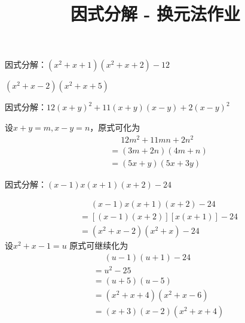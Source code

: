 \documentclass[windows,csize4]{BHCexam}
\title{因式分解 - 换元法作业}
\begin{document}
\maketitle


\begin{groups}
    \begin{questions}[]

        \question[5] 因式分解：$(x^2+x+1)(x^2+x+2)-12$
        \begin{solution}{0.5cm}
            \methodonly $(x^2+x-2)(x^2+x+5)$
        \end{solution}
        \vspace{3.5cm}

        \question[5] 因式分解：$12(x+y)^2+11(x+y)(x-y)+2(x-y)^2$
        \begin{solution}{0.5cm}
            \methodonly 设$x+y=m,x-y=n$，原式可化为
            \[
                \begin{aligned}
                     & \phantom{=}12m^2+11mn+2n^2 \\
                     & = (3m+2n)(4m+n)            \\
                     & = (5x+y)(5x+3y)
                \end{aligned}
            \]
        \end{solution}
        \vspace{3.5cm}

        \question[5] 因式分解：$(x-1)x(x+1)(x+2)-24$
        \begin{solution}{0.5cm}
            \methodonly
            \[
                \begin{aligned}
                     & \phantom{=}(x-1)x(x+1)(x+2)-24 \\
                     & = [(x-1)(x+2)][x(x+1)]-24      \\
                     & = (x^2+x-2)(x^2+x)-24
                \end{aligned}
            \]
            设$x^2+x-1=u$ 原式可继续化为
            \[
                \begin{aligned}
                     & \phantom{=}(u-1)(u+1)-24 \\
                     & = u^2-25                 \\
                     & = (u+5)(u-5)             \\
                     & = (x^2+x+4)(x^2+x-6)     \\
                     & = (x+3)(x-2)(x^2+x+4)
                \end{aligned}
            \]
        \end{solution}
        \vspace{3.5cm}


\end{questions}
\end{groups}
\end{document}
